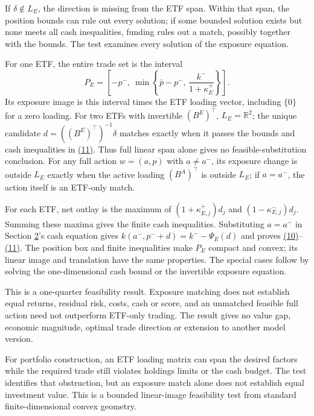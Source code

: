 \documentclass[11pt]{article}
\begin{document}
If \(\delta\notin L_E\), the direction is missing from the ETF span.
Within that span, the position bounds can rule out every solution; if
some bounded solution exists but none meets all cash inequalities,
funding rules out a match, possibly together with the bounds. The test
examines every solution of the exposure equation.

For one ETF, the entire trade set is the interval
\begin{equation*}
P_E=\left[-p^-,\
\min\left\{\bar p-p^-,\,\frac{k^-}{1+\kappa^+_E}\right\}\right].
                                                        \tag{12}\label{eq:12}
\end{equation*}
Its exposure image is this interval times the ETF loading vector,
including \(\{0\}\) for a zero loading. For two ETFs with invertible
\((B^E)^\top\), \(L_E=\mathbb R^2\); the unique candidate
\(d=((B^E)^\top)^{-1}\delta\) matches exactly when it passes the bounds
and cash inequalities in \hyperref[eq:11]{(11)}. Thus full linear span alone gives no
feasible-substitution conclusion. For any full action \(w=(a,p)\) with
\(a\ne a^-\), its exposure change is outside \(L_E\) exactly when the
active loading \((B^A)^\top\) is outside \(L_E\); if \(a=a^-\), the action
itself is an ETF-only match.

For each ETF, net outlay is the maximum of
\((1+\kappa^+_{E,j})d_j\) and \((1-\kappa^-_{E,j})d_j\).
Summing these maxima gives the finite cash inequalities. Substituting
\(a=a^-\) in Section \hyperref[sec:2]{2}'s cash equation gives \(k(a^-,p^-+d)=k^--\Psi_E(d)\)
and proves \hyperref[eq:10]{(10)}--\hyperref[eq:11]{(11)}. The position box and finite inequalities make
\(P_E\) compact and convex; its linear image and translation have the
same properties. The special cases follow by solving the one-dimensional
cash bound or the invertible exposure equation.

This is a one-quarter feasibility result. Exposure matching does not
establish equal returns, residual risk, costs, cash or score, and an
unmatched feasible full action need not outperform ETF-only trading.
The result gives no value gap, economic magnitude, optimal trade
direction or extension to another model version.

For portfolio construction, an ETF loading matrix can span the
desired factors while the required trade still violates holdings
limits or the cash budget. The test identifies that obstruction,
but an exposure match alone does not establish equal investment
value. This is a bounded linear-image feasibility test from standard
finite-dimensional convex geometry.
\end{document}
